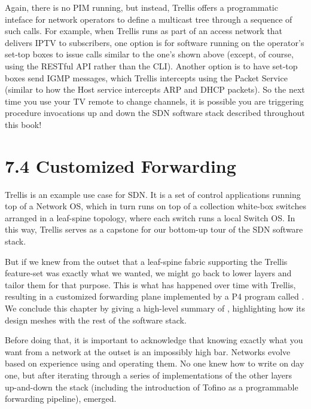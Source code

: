 \documentclass[letterpaper,11pt,english]{sphinxmanual}
\begin{document}
\begin{sphinxVerbatim}[commandchars=\\\{\}]
\end{sphinxVerbatim}

Again, there is no PIM running, but instead, Trellis offers a
programmatic inteface for network operators to define a multicast tree
through a sequence of such calls. For example, when Trellis runs as
part of an access network that delivers IPTV to subscribers, one
option is for software running on the operator’s set-top boxes to
issue calls similar to the one’s shown above (except, of course, using
the RESTful API rather than the CLI). Another option is to have
set-top boxes send IGMP messages, which Trellis intercepts using the
Packet Service (similar to how the Host service intercepts ARP and
DHCP packets). So the next time you use your TV remote to change
channels, it is possible you are triggering procedure invocations up
and down the SDN software stack described throughout this book!


\section{7.4  Customized Forwarding}
\label{\detokenize{trellis:customized-forwarding}}
Trellis is an example use case for SDN. It is a set of control
applications running top of a Network OS, which in turn runs on top of
a collection white-box switches arranged in a leaf-spine topology,
where each switch runs a local Switch OS. In this way, Trellis serves
as a capstone for our bottom-up tour of the SDN software stack.

But if we knew from the outset that a leaf-spine fabric supporting the
Trellis feature-set was exactly what we wanted, we might go back to
lower layers and tailor them for that purpose. This is what has
happened over time with Trellis, resulting in a customized forwarding
plane implemented by a P4 program called . We conclude
this chapter by giving a high-level summary of ,
highlighting how its design meshes with the rest of the software
stack.

Before doing that, it is important to acknowledge that knowing exactly
what you want from a network at the outset is an impossibly high
bar. Networks evolve based on experience using and operating them. No
one knew how to write  on day one, but after iterating
through a series of implementations of the other layers up-and-down
the stack (including the introduction of Tofino as a programmable
forwarding pipeline),  emerged. 
\end{document}
